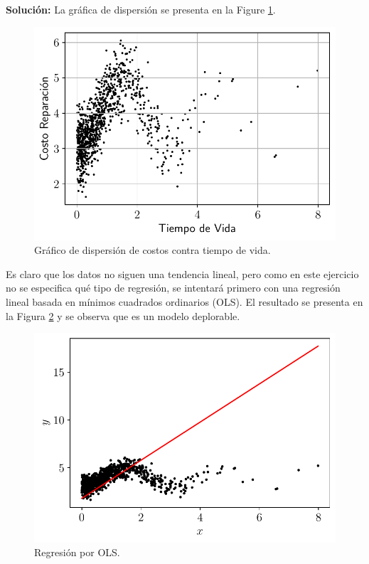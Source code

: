 \documentclass[fleqn]{article}
\begin{document}
\textbf{Solución:} 
La gráfica de dispersión se presenta en la Figure \ref{fig:1f1}. 
\begin{figure}[H]
    \centering
    \includegraphics[scale=.6]{1f_scatter.pdf}
    \caption{Gráfico de dispersión de costos contra tiempo de vida.}
    \label{fig:1f1}
\end{figure}
Es claro que los datos no siguen una tendencia lineal, pero como en este ejercicio no se especifica qué tipo de regresión, se intentará primero con una regresión lineal basada en mínimos cuadrados ordinarios (OLS). El resultado se presenta en la Figura \ref{fig:1f2} y se observa que es un modelo deplorable. 
\begin{figure}[H]
    \centering
    \includegraphics[scale=.6]{1f.pdf}
    \caption{Regresión por OLS.}
    \label{fig:1f2}
\end{figure}
\end{document}
